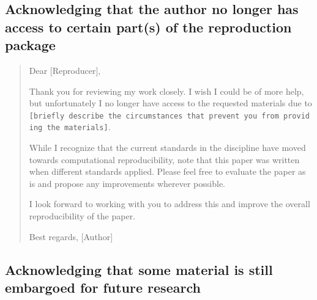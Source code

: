\documentclass[
  openany]{book}
\begin{document}
\hypertarget{acknowledging-that-the-author-no-longer-has-access-to-certain-parts-of-the-reproduction-package}{%
\subsection{Acknowledging that the author no longer has access to certain part(s) of the reproduction package}\label{acknowledging-that-the-author-no-longer-has-access-to-certain-parts-of-the-reproduction-package}}

\begin{quote}
Dear {[}Reproducer{]},

Thank you for reviewing my work closely. I wish I could be of more help, but unfortunately I no longer have access to the requested materials due to \texttt{{[}briefly\ describe\ the\ circumstances\ that\ prevent\ you\ from\ providing\ the\ materials{]}}.

While I recognize that the current standards in the discipline have moved towards computational reproducibility, note that this paper was written when different standards applied. Please feel free to evaluate the paper as is and propose any improvements wherever possible.

I look forward to working with you to address this and improve the overall reproducibility of the paper.

Best regards,
{[}Author{]}
\end{quote}

\hypertarget{acknowledging-that-some-material-is-still-embargoed-for-future-research}{%
\subsection{Acknowledging that some material is still embargoed for future research}\label{acknowledging-that-some-material-is-still-embargoed-for-future-research}}
\end{document}
